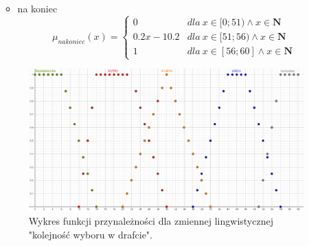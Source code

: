 \documentclass{classrep}
\begin{document}
\begin{enumerate}
\begin{itemize}
\begin{equation}
        \end{equation}
        \item na koniec
        \begin{equation}
            \mu_{nakoniec}(x) = \left\{\begin{matrix}  0 & dla \: x\in [0;51) \wedge x\in \mathbf{N} \\ 0.2x - 10.2 & dla \: x\in[51;56)\wedge x\in \mathbf{N} \\ 1 & dla \: x\in [56;60]\wedge x\in \mathbf{N} \end{matrix}\right.
        \end{equation}
    \end{itemize}
    \begin{figure}[H]
        \centering
        \includegraphics[width=14cm]{wykres_draft.png}
        \caption{Wykres funkcji przynależności dla zmiennej lingwistycznej "kolejność wyboru w drafcie".}
        \label{rysunek:draft}
    \end{figure}
    

\end{enumerate}
\end{document}
